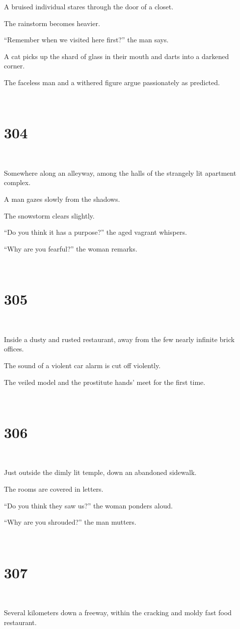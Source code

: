 \documentclass{report}
\begin{document}
A bruised individual stares through the door of a closet.

The rainstorm becomes heavier.

``Remember when we visited here first?'' the man says.

A cat picks up the shard of glass in their mouth and darts into a darkened corner.

The faceless man and a withered figure argue passionately as predicted.

~
\chapter*{304}
~

Somewhere along an alleyway, among the halls of the strangely lit apartment complex.

A man gazes slowly from the shadows.

The snowstorm clears slightly.

``Do you think it has a purpose?'' the aged vagrant whispers.

``Why are you fearful?'' the woman remarks.

~
\chapter*{305}
~

Inside a dusty and rusted restaurant, away from the few nearly infinite brick offices.

The sound of a violent car alarm is cut off violently.

The veiled model and the prostitute hands' meet for the first time.

~
\chapter*{306}
~

Just outside the dimly lit temple, down an abandoned sidewalk.

The rooms are covered in letters.

``Do you think they saw us?'' the woman ponders aloud.

``Why are you shrouded?'' the man mutters.

~
\chapter*{307}
~

Several kilometers down a freeway, within the cracking and moldy fast food restaurant.
\end{document}
